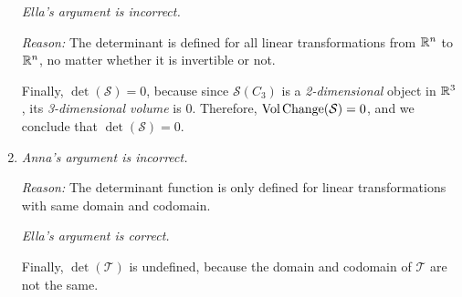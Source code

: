 \begin{exercises}
\begin{problist}
\begin{solution}
\begin{enumerate}
					\emph{Ella's argument is incorrect.}

					\emph{Reason:} The determinant is defined for all linear
					transformations from $\mathbb{R}^{n}$ to $\mathbb{R}^{n}$, no matter whether
					it is invertible or not.

					Finally, $\det(\mathcal{S})=0$, because since $\mathcal{S}(C_{3}
					)$ is a \emph{2-dimensional} object in $\mathbb{R}^{3}$, its \emph{3-dimensional
					volume} is $0$. Therefore, $\operatorname{Vol\hspace{1.5pt}Change}(\mathcal{S})=0$, and we
					conclude that $\det(\mathcal{S})=0$.

				\item \emph{Anna's argument is incorrect.}

					\emph{Reason:} The determinant function is only defined for
					linear transformations with same domain and codomain.

					\emph{Ella's argument is correct.}

					Finally, $\det(\mathcal{T})$ is undefined, because the domain
					and codomain of $\mathcal{T}$ are not the same.
			\end{enumerate}
		\end{solution}
	\end{problist}
\end{exercises}
